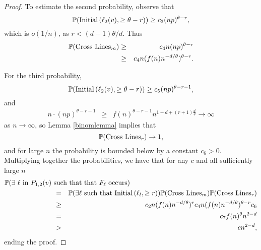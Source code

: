 \documentclass{amsart}
\newcommand{\prob}{\mathbb{P}}
\newcommand{\threshold}{\theta}
\newcommand{\noodle}{r}
\newcommand{\I}[2]{\hbox{Initial}\left(#1, \geq #2\right)}
\newcommand{\Gonez}{\hbox{Cross Lines}_m}
\newcommand{\Gtwoz}{\hbox{Cross Lines}_r}
\numberwithin{equation}{section}
\newcommand{\Ln}{\ell}
\theoremstyle{definition}
\theoremstyle{remark}
\begin{document}
\begin{proof}
To estimate the second probability, observe that 
$$\prob(\I{\Ln_2(v)}{\threshold-\noodle})\ge c_3 (np)^{\theta-r},$$
which is $o(1/n)$, as $r<(d-1)\threshold/d$. Thus 
\begin{eqnarray*}
\prob(\Gonez)
 &\geq& c_4 n (np)^{\threshold- \noodle}\\
 &\geq& c_4 n (f(n)n^{-d/\threshold})^{\threshold- \noodle}.
\end{eqnarray*}

For the third probability, 
$$\prob(\I{\Ln_2(v)}{\threshold-\noodle})\ge c_5 (np)^{\theta-r-1},$$
and 
\begin{eqnarray*}
n\cdot (np)^{\theta-r-1}
 &\geq&   f(n)^{\threshold - \noodle - 1}n^{1-d+(\noodle+1)\frac{d}{\threshold}} \to \infty
\end{eqnarray*}
as $n\to\infty$, 
so Lemma \ref{binomlemma} implies that 
$$
\prob(\Gtwoz) \to 1,
$$
and for large $n$ the probability is bounded below by a constant $c_6>0$.
Multiplying together the probabilities, we have that for any $c$ and all sufficiently large $n$
\begin{eqnarray*}
\lefteqn{\prob(\text{$\exists$ $\Ln$ in $P_{1,2}(v)$ such that that $F_\Ln$ occurs} )}\hspace{1in}&&\\
 &=&\prob(\exists \Ln \text{ such that }\I{\Ln_l}{\noodle})\prob( \Gonez)\prob( \Gtwoz)\\
 &\geq& c_2n(f(n)n^{-d/\threshold})^{\noodle}c_4n (f(n)n^{-d/\threshold})^{\threshold- \noodle}c_6\\
&=& c_7f(n)^\threshold n^{2-d} \\
&>& c n^{2-d},
\end{eqnarray*}
ending the proof.
\begin{comment}
The case when $d=\threshold=3$ is 
almost identical except the roles of the first and second events are reversed. This happens because $\noodle=1<\threshold-\noodle =2$. This is the only choice of $d$ and $\threshold$ for which $\noodle < \threshold -\noodle$. We leave the details to the reader.
\end{comment}
\end{proof}
\end{document}

